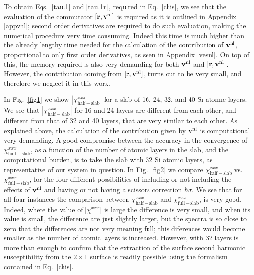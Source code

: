 \documentclass[floatfix,prb,aps,superscriptaddress,11pt,preprint,letterpaper]{revtex4}
\begin{document}
To obtain Eqs.~\eqref{tau.1}  and \eqref{tau.1n}, required in
Eq.~\eqref{chis},
we see that the
evaluation of the commutator $[\mathbf{r},\mathbf{v}^{\mathrm{nl}}]$ is required as it is
outlined in Appendix \ref{appvnl}; second order derivatives
are required to do such evaluation, making the numerical
procedure very
time consuming. Indeed this time is much higher than the already
lengthy time needed for the calculation of the contribution of
$\mathbf{v}^{\mathrm{nl}}$, proportional to only first order derivatives, as seen in
Appendix \ref{vesnl}. 
On top of this, the memory required is also very demanding for both
$\mathbf{v}^{\mathrm{nl}}$ and $[\mathbf{r},\mathbf{v}^{\mathrm{nl}}]$.
However, the contribution coming from 
$[\mathbf{r},\mathbf{v}^{\mathrm{nl}}]$, turns out to be very small,\cite{valerie} and
therefore we neglect it in this work.

In Fig.~\ref{fig1} we show $|\chi_{\mathrm{half-slab}}^{xxx}|$
 for a
slab of 16, 24, 32, and 40 Si atomic layers. We see that 
$|\chi_{\mathrm{half-slab}}^{xxx}|$ for
16 and 24
layers are different from each other, and different from that of 32
and 40 layers,
that are very similar to each other.
As explained above,
the calculation of the contribution given by
$\mathbf{v}^{\mathrm{nl}}$ is computational very demanding. A good
compromise between the accuracy in the convergence of
$\chi^{xxx}_{\mathrm{half-slab}}$,
 as a function of the number
of atomic layers in the slab, and the computational burden, is to take
the slab with 32 Si atomic layers, as representative of our system
in question.
In Fig.~\ref{fig2}
we compare 
$\chi^{xxx}_{\mathrm{half-slab}}$  
vs. 
$\chi^{xxx}_{\mathrm{full-slab}}$, 
for the four different possibilities of including or not including the
effects of $\mathbf{v}^{\mathrm{nl}}$ and having or not having a scissors correction
$\hbar\sigma$.
We see that for all four instances the comparison between
$\chi^{xxx}_{\mathrm{half-slab}}$ 
and
$\chi^{xxx}_{\mathrm{full-slab}}$,
is very good. Indeed, where the value of $|\chi^{xxx}|$ is large the
difference is very small, and when its value is small, the difference
are just slightly larger, but the spectra is so close to zero that the
differences are not very meaning full; this diferences would become
smaller as the number of atomic layers is increased. However, with 32
layers is more than enough to 
confirm that the extraction of the surface second
harmonic susceptibility from the $2\times 1$ surface is 
readily possible using the formalism contained in Eq.~\eqref{chis}.
\end{document}
